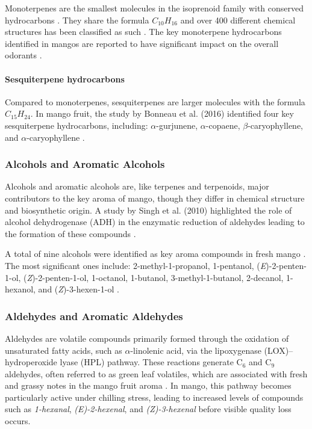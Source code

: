 Monoterpenes are the smallest molecules in the isoprenoid family with conserved hydrocarbons \cite*{A09_Barras2024}. They share the formula $C_{10}H_{16}$ and over 400 different chemical structures has been classified as such \cite*{A09_Barras2024}. The key monoterpene hydrocarbons identified in mangos are reported to have significant impact on the overall odorants \cite*{A07_Bonneau2016}.

\paragraph*{Sesquiterpene hydrocarbons}
Compared to monoterpenes, sesquiterpenes are larger molecules with the formula $C_{15}H_{24}$. In mango fruit, the study by Bonneau et al. (2016) identified four key sesquiterpene hydrocarbons, including: $\alpha$-gurjunene, $\alpha$-copaene, $\beta$-caryophyllene, and $\alpha$-caryophyllene \cite*{A07_Bonneau2016}.

\subsubsection*{Alcohols and Aromatic Alcohols}
Alcohols and aromatic alcohols are, like terpenes and terpenoids, major contributors to the key aroma of mango, though they differ in chemical structure and biosynthetic origin. A study by Singh et al. (2010) highlighted the role of alcohol dehydrogenase (ADH) in the enzymatic reduction of aldehydes leading to the formation of these compounds \cite*{A10_Singh2010}.

\vspace{0.5em}
A total of nine alcohols were identified as key aroma compounds in fresh mango \cite*{A07_Bonneau2016}. The most significant ones include: 2-methyl-1-propanol, 1-pentanol, (\textit{E})-2-penten-1-ol, (\textit{Z})-2-penten-1-ol, 1-octanol, 1-butanol, 3-methyl-1-butanol, 2-decanol, 1-hexanol, and (\textit{Z})-3-hexen-1-ol \cite*{A07_Bonneau2016}.

\subsubsection*{Aldehydes and Aromatic Aldehydes}
Aldehydes are volatile compounds primarily formed through the oxidation of unsaturated fatty acids, such as $\alpha$-linolenic acid, via the lipoxygenase (LOX)–hydroperoxide lyase (HPL) pathway. These reactions generate C$_6$ and C$_9$ aldehydes, often referred to as green leaf volatiles, which are associated with fresh and grassy notes in the mango fruit aroma \cite*{A11_Sivankalyani2017}. In mango, this pathway becomes particularly active under chilling stress, leading to increased levels of compounds such as \textit{1-hexanal}, \textit{(E)-2-hexenal}, and \textit{(Z)-3-hexenal} before visible quality loss occurs.

